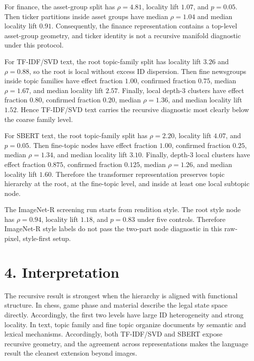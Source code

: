 \documentclass[11pt]{article}
\begin{document}
For finance, the asset-group split has \(\rho = 4.81\), locality lift \(1.07\), and \(p = 0.05\). Then ticker partitions inside asset groups have median \(\rho = 1.04\) and median locality lift \(0.91\). Consequently, the finance representation contains a top-level asset-group geometry, and ticker identity is not a recursive manifold diagnostic under this protocol.

For TF-IDF/SVD text, the root topic-family split has locality lift \(3.26\) and \(\rho = 0.88\), so the root is local without excess ID dispersion. Then fine newsgroups inside topic families have effect fraction \(1.00\), confirmed fraction \(0.75\), median \(\rho = 1.67\), and median locality lift \(2.57\). Finally, local depth-3 clusters have effect fraction \(0.80\), confirmed fraction \(0.20\), median \(\rho = 1.36\), and median locality lift \(1.52\). Hence TF-IDF/SVD text carries the recursive diagnostic most clearly below the coarse family level.

For SBERT text, the root topic-family split has \(\rho = 2.20\), locality lift \(4.07\), and \(p = 0.05\). Then fine-topic nodes have effect fraction \(1.00\), confirmed fraction \(0.25\), median \(\rho = 1.34\), and median locality lift \(3.10\). Finally, depth-3 local clusters have effect fraction \(0.875\), confirmed fraction \(0.125\), median \(\rho = 1.26\), and median locality lift \(1.60\). Therefore the transformer representation preserves topic hierarchy at the root, at the fine-topic level, and inside at least one local subtopic node.

The ImageNet-R screening run starts from rendition style. The root style node has \(\rho = 0.94\), locality lift \(1.18\), and \(p = 0.83\) under five controls. Therefore ImageNet-R style labels do not pass the two-part node diagnostic in this raw-pixel, style-first setup.

\section{4. Interpretation}\label{interpretation}

The recursive result is strongest when the hierarchy is aligned with functional structure. In chess, game phase and material describe the legal state space directly. Accordingly, the first two levels have large ID heterogeneity and strong locality. In text, topic family and fine topic organize documents by semantic and lexical mechanisms. Accordingly, both TF-IDF/SVD and SBERT expose recursive geometry, and the agreement across representations makes the language result the cleanest extension beyond images.
\end{document}

